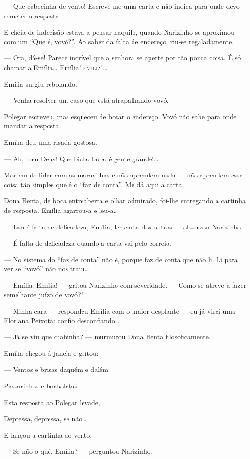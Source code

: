 --- Que cabecinha de vento! Escreve-me uma carta e não indica para onde
devo remeter a resposta.

E cheia de indecisão estava a pensar naquilo, quando Narizinho se
aproximou com um ``Que é, vovó?''. Ao saber da falta de endereço, riu-se
regaladamente.

--- Ora, dá-se! Parece incrível que a senhora se aperte por tão pouca
coisa. É só chamar a Emília\ldots{} Emília! \textsc{emília}!\ldots{}

Emília surgiu rebolando.

--- Venha resolver um caso que está atrapalhando vovó.

Polegar escreveu, mas esqueceu de botar o endereço. Vovó não sabe para
onde mandar a resposta.

Emília deu uma risada gostosa.

--- Ah, meu Deus! Que bicho bobo é gente grande!\ldots{}

Morrem de lidar com as maravilhas e não aprendem nada --- não aprendem
essa coisa tão simples que é o ``faz de conta''. Me dá aqui a carta.

Dona Benta, de boca entreaberta e olhar admirado, foi-lhe entregando a
cartinha de resposta. Emília agarrou-a e leu-a\ldots{}

--- Isso é falta de delicadeza, Emília, ler carta dos outros ---
observou Narizinho.

--- É falta de delicadeza quando a carta vai pelo correio.

--- No sistema do ``faz de conta'' não é, porque faz de conta que não
li. Li para ver se ``vovó'' não nos traiu\ldots{}

--- Emília, Emília! --- gritou Narizinho com severidade. --- Como se
atreve a fazer semelhante juízo de vovó?!

--- Minha cara --- respondeu Emília com o maior desplante --- eu já
virei uma Floriana Peixota: confio desconfiando\ldots{}

--- Já se viu que diabinha? --- murmurou Dona Benta filosoficamente.

Emília chegou à janela e gritou:

--- Ventos e brisas daquém e dalém

Passarinhos e borboletas

Esta resposta ao Polegar levade,

Depressa, depressa, se não\ldots{}

E lançou a cartinha ao vento.

--- Se não o quê, Emília? --- perguntou Narizinho.

